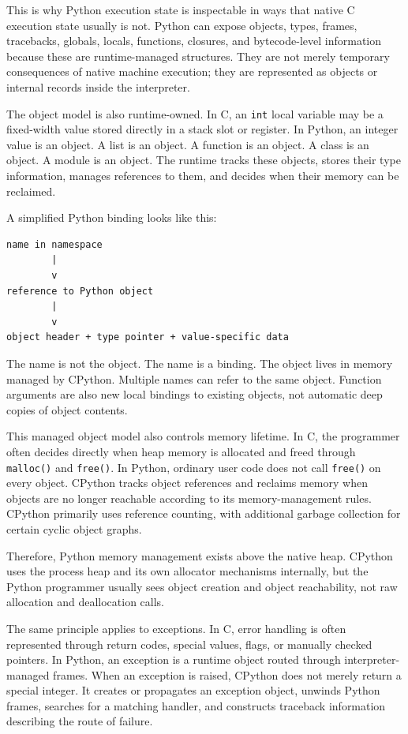 \documentclass[a4paper,twoside]{report}
\begin{document}
This is why Python execution state is inspectable in ways that native C execution state usually is not. Python can expose objects, types, frames, tracebacks, globals, locals, functions, closures, and bytecode-level information because these are runtime-managed structures. They are not merely temporary consequences of native machine execution; they are represented as objects or internal records inside the interpreter.

The object model is also runtime-owned. In C, an \texttt{int} local variable may be a fixed-width value stored directly in a stack slot or register. In Python, an integer value is an object. A list is an object. A function is an object. A class is an object. A module is an object. The runtime tracks these objects, stores their type information, manages references to them, and decides when their memory can be reclaimed.

A simplified Python binding looks like this:

\begin{verbatim}
name in namespace
        |
        v
reference to Python object
        |
        v
object header + type pointer + value-specific data
\end{verbatim}

The name is not the object. The name is a binding. The object lives in memory managed by CPython. Multiple names can refer to the same object. Function arguments are also new local bindings to existing objects, not automatic deep copies of object contents.

This managed object model also controls memory lifetime. In C, the programmer often decides directly when heap memory is allocated and freed through \texttt{malloc()} and \texttt{free()}. In Python, ordinary user code does not call \texttt{free()} on every object. CPython tracks object references and reclaims memory when objects are no longer reachable according to its memory-management rules. CPython primarily uses reference counting, with additional garbage collection for certain cyclic object graphs.

Therefore, Python memory management exists above the native heap. CPython uses the process heap and its own allocator mechanisms internally, but the Python programmer usually sees object creation and object reachability, not raw allocation and deallocation calls.

The same principle applies to exceptions. In C, error handling is often represented through return codes, special values, flags, or manually checked pointers. In Python, an exception is a runtime object routed through interpreter-managed frames. When an exception is raised, CPython does not merely return a special integer. It creates or propagates an exception object, unwinds Python frames, searches for a matching handler, and constructs traceback information describing the route of failure.
\end{document}
